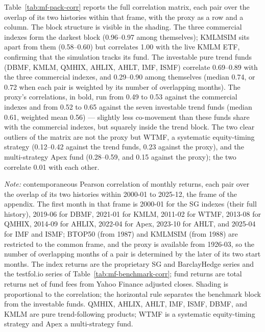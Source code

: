 \documentclass[11pt]{article}
\begin{document}
Table~\ref{tab:mf-pack-corr} reports the full correlation matrix, each pair
over the overlap of its two histories within that frame, with the proxy as a
row and a column. The block structure is visible in the shading. The three
commercial indexes form the darkest block (0.96--0.97 among themselves);
KMLMSIM sits apart from them (0.58--0.60) but correlates 1.00 with the live
KMLM ETF, confirming that the simulation tracks its fund. The investable pure
trend funds (DBMF, KMLM, QMHIX, AHLIX, AHLT, IMF, ISMF) correlate 0.69--0.89
with the three commercial indexes, and 0.29--0.90 among themselves (median
0.74, or 0.72 when each pair is weighted by its number of overlapping months).
The proxy's correlations, in bold, run from 0.49 to 0.53 against the
commercial indexes and from 0.52 to 0.65 against the seven investable trend
funds (median 0.61, weighted mean 0.56) --- slightly less co-movement than
these funds share with the commercial indexes, but squarely inside the trend
block. The two clear outliers of the matrix are not the proxy but WTMF, a
systematic equity-timing strategy (0.12--0.42 against the trend funds, 0.23
against the proxy), and the multi-strategy Apex fund (0.28--0.59, and 0.15
against the proxy); the two correlate 0.01 with each other.

\begin{table}[H]
\centering
\caption{Correlation matrix of monthly returns: the net proxy, commercial
benchmarks, and investable managed-futures funds}
\label{tab:mf-pack-corr}
\footnotesize

\begin{minipage}{0.86\textwidth}\footnotesize
\textit{Note:} contemporaneous Pearson correlation of monthly returns, each
pair over the overlap of its two histories within 2000-01 to 2025-12, the
frame of the appendix. The first month in that frame is 2000-01 for the SG
indexes (their full history), 2019-06 for DBMF, 2021-01 for KMLM, 2011-02 for
WTMF, 2013-08 for QMHIX, 2014-09 for AHLIX, 2022-04 for Apex, 2023-10 for
AHLT, and 2025-04 for IMF and ISMF; BTOP50 (from 1987) and KMLMSIM (from
1988) are restricted to the common frame, and the proxy is available from
1926-03, so the number of overlapping months of a pair is determined by the
later of its two start months. The index returns are the proprietary SG and
BarclayHedge series and the testfol.io series of
Table~\ref{tab:mf-benchmark-corr}; fund returns are total returns net of fund
fees from Yahoo Finance adjusted closes. Shading is proportional to the
correlation; the horizontal rule separates the benchmark block from the
investable funds. QMHIX, AHLIX, AHLT, IMF, ISMF, DBMF, and KMLM are pure
trend-following products; WTMF is a systematic equity-timing strategy and
Apex a multi-strategy fund.
\end{minipage}
\end{table}
\end{document}
